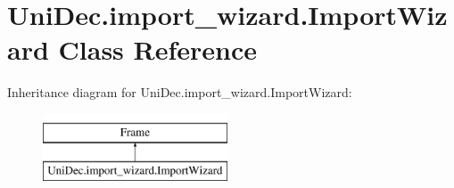 \hypertarget{class_uni_dec_1_1import__wizard_1_1_import_wizard}{}\section{Uni\+Dec.\+import\+\_\+wizard.\+Import\+Wizard Class Reference}
\label{class_uni_dec_1_1import__wizard_1_1_import_wizard}
Inheritance diagram for Uni\+Dec.\+import\+\_\+wizard.\+Import\+Wizard\+:\begin{figure}[H]
\begin{center}
\leavevmode
\includegraphics[height=2.000000cm]{class_uni_dec_1_1import__wizard_1_1_import_wizard}
\end{center}
\end{figure}
